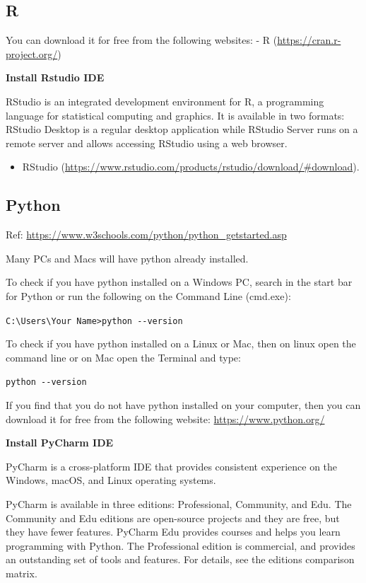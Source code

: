 \documentclass[
]{book}
\providecommand{\tightlist}{%
  \setlength{\itemsep}{0pt}\setlength{\parskip}{0pt}}
\begin{document}
\hypertarget{r-3}{%
\subsection{R}\label{r-3}}

You can download it for free from the following websites:
- R (\url{https://cran.r-project.org/})

\textbf{Install Rstudio IDE}

RStudio is an integrated development environment for R, a programming language for statistical computing and graphics. It is available in two formats: RStudio Desktop is a regular desktop application while RStudio Server runs on a remote server and allows accessing RStudio using a web browser.

\begin{itemize}
\tightlist
\item
  RStudio (\url{https://www.rstudio.com/products/rstudio/download/\#download}).
\end{itemize}

\hypertarget{python-3}{%
\subsection{Python}\label{python-3}}

Ref: \url{https://www.w3schools.com/python/python_getstarted.asp}

Many PCs and Macs will have python already installed.

To check if you have python installed on a Windows PC, search in the start bar for Python or run the following on the Command Line (cmd.exe):

\texttt{C:\textbackslash{}Users\textbackslash{}Your\ Name\textgreater{}python\ -\/-version}

To check if you have python installed on a Linux or Mac, then on linux open the command line or on Mac open the Terminal and type:

\texttt{python\ -\/-version}

If you find that you do not have python installed on your computer, then you can download it for free from the following website: \url{https://www.python.org/}

\textbf{Install PyCharm IDE}

PyCharm is a cross-platform IDE that provides consistent experience on the Windows, macOS, and Linux operating systems.

PyCharm is available in three editions: Professional, Community, and Edu. The Community and Edu editions are open-source projects and they are free, but they have fewer features. PyCharm Edu provides courses and helps you learn programming with Python. The Professional edition is commercial, and provides an outstanding set of tools and features. For details, see the editions comparison matrix.
\end{document}
